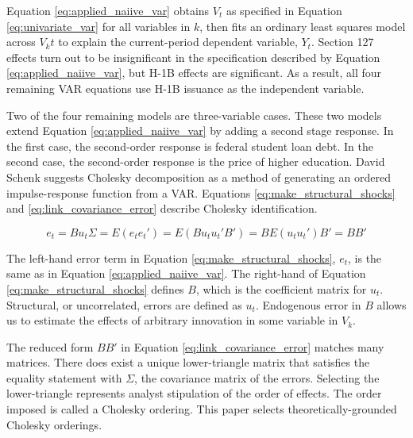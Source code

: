 \documentclass[review]{elsarticle}
\begin{document}
Equation \ref{eq:applied_naiive_var}
obtains $V_t$ as specified in Equation \ref{eq:univariate_var}
for all variables in $k$,
then fits an ordinary least squares model across $V_kt$ to explain the current-period dependent variable, $Y_t$.
Section 127 effects turn out to be insignificant in the specification described by Equation \ref{eq:applied_naiive_var},
but H-1B effects are significant.
As a result, all four remaining VAR equations use H-1B issuance as the independent variable.

Two of the four remaining models are three-variable cases.
These two models extend Equation \ref{eq:applied_naiive_var} by adding a second stage response.
In the first case, the second-order response is federal student loan debt.
In the second case, the second-order response is the price of higher education.
David Schenk suggests Cholesky decomposition as a method of generating an ordered impulse-response function from a VAR\cite{schenck_2016}.
Equations \ref{eq:make_structural_shocks} and \ref{eq:link_covariance_error} describe Cholesky identification.

\begin{subequations}
    \begin{equation}
        e_t = Bu_t
        \label{eq:make_structural_shocks}
    \end{equation}
    \begin{equation}
        \Sigma = E(e_t e_t')
        = E(Bu_tu_t'B')
        = B E(u_t u_t') B'
        = B B'
        \label{eq:link_covariance_error}
    \end{equation}
\end{subequations}

The left-hand error term in Equation \ref{eq:make_structural_shocks}, $e_t$,
is the same as in Equation \ref{eq:applied_naiive_var}.
The right-hand of Equation \ref{eq:make_structural_shocks} defines $B$,
which is the coefficient matrix for $u_t$.
Structural, or uncorrelated, errors are defined as $u_t$.
Endogenous error in $B$ allows us to estimate the effects of arbitrary innovation in some variable in $V_k$.

The reduced form $BB'$ in Equation \ref{eq:link_covariance_error} matches many matrices.
There does exist a unique lower-triangle matrix that satisfies
the equality statement with $\Sigma$, the covariance matrix of the errors.
Selecting the lower-triangle represents analyst stipulation of the order of effects.
The order imposed is called a Cholesky ordering.
This paper selects theoretically-grounded Cholesky orderings.
\end{document}
